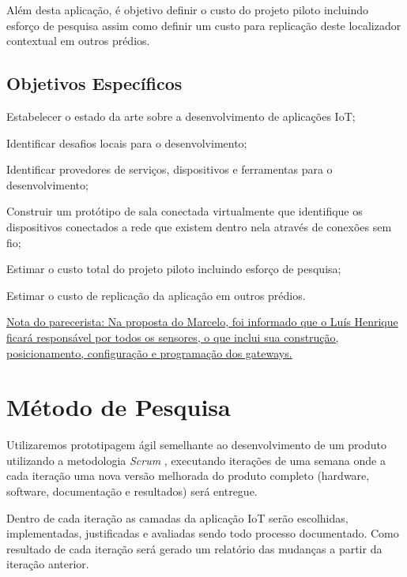 \documentclass[
	12pt,				%
	openright,			%
	oneside,			%
	a4paper,			%
	chapter=TITLE,		%
	english,			%
	french,				%
	spanish,			%
	brazil				%
	]{abntex2}
\begin{document}
{Além desta aplicação, é objetivo definir o custo do projeto piloto incluindo
esforço de pesquisa assim como definir um custo para replicação deste
localizador contextual em outros prédios.

\section{Objetivos Específicos}

\begin{alineas}

	\item Estabelecer o estado da arte sobre a desenvolvimento de aplicações IoT;

	\item Identificar desafios locais para o desenvolvimento;

	\item Identificar provedores de serviços, dispositivos e ferramentas para o
	desenvolvimento;

	\item Construir um protótipo de sala conectada virtualmente que identifique
	os dispositivos conectados a rede que existem dentro nela através de
	conexões sem fio;

	\item Estimar o custo total do projeto piloto incluindo esforço de pesquisa;

	\item Estimar o custo de replicação da aplicação em outros prédios.

\end{alineas}

\underline{Nota do parecerista: Na proposta do Marcelo, foi informado que o Luís
Henrique ficará responsável por todos os sensores, o que inclui sua construção,
posicionamento, configuração e programação dos gateways.}

\chapter{Método de Pesquisa}

Utilizaremos prototipagem ágil semelhante ao desenvolvimento de um produto
utilizando a metodologia \textit{Scrum} \cite{James2016}, executando iterações
de uma semana onde a cada iteração uma nova versão melhorada do produto completo
(hardware, software, documentação e resultados) será entregue.

Dentro de cada iteração as camadas da aplicação IoT serão escolhidas,
implementadas, justificadas e avaliadas sendo todo processo documentado. Como
resultado de cada iteração será gerado um relatório das mudanças a partir da
iteração anterior.

}
\end{document}
